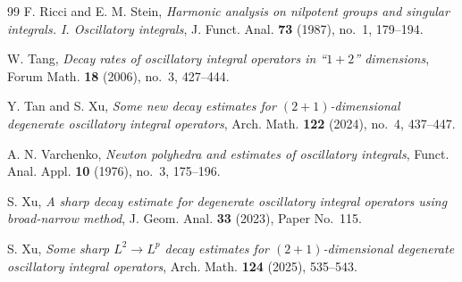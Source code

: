 \documentclass[10pt]{amsart}
\numberwithin{equation}{section}
\theoremstyle{definition}
\theoremstyle{remark}
\theoremstyle{remark}
\begin{document}
\begin{thebibliography}{99}
		F. Ricci and E. M. Stein,
		\emph{Harmonic analysis on nilpotent groups and singular integrals. I. Oscillatory integrals},
		J. Funct. Anal. \textbf{73} (1987), no.~1, 179--194.

		W. Tang,
		\emph{Decay rates of oscillatory integral operators in ``\(1+2\)'' dimensions},
		Forum Math. \textbf{18} (2006), no.~3, 427--444.
		
		Y. Tan and S. Xu,
		\emph{Some new decay estimates for \((2+1)\)-dimensional degenerate oscillatory integral operators},
		Arch. Math. \textbf{122} (2024), no.~4, 437--447.
		
		A. N. Varchenko,
		\emph{Newton polyhedra and estimates of oscillatory integrals},
		Funct. Anal. Appl. \textbf{10} (1976), no.~3, 175--196.
		
		S. Xu,
		\emph{A sharp decay estimate for degenerate oscillatory integral operators using broad-narrow method},
		J. Geom. Anal. \textbf{33} (2023), Paper No.~115.
		
		S. Xu,
		\emph{Some sharp \(L^2\to L^p\) decay estimates for \((2+1)\)-dimensional degenerate oscillatory integral operators},
		Arch. Math. \textbf{124} (2025), 535--543.
		
	\end{thebibliography}
	
	
	 
\end{document}

